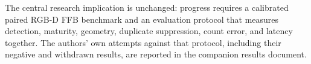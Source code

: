 The central research implication is unchanged: progress requires a calibrated paired RGB-D FFB benchmark and an evaluation protocol that measures detection, maturity, geometry, duplicate suppression, count error, and latency together. The authors' own attempts against that protocol, including their negative and withdrawn results, are reported in the companion results document.
